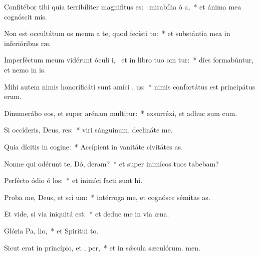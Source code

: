 \item Confitébor tibi quia terribíliter magnifitus es:~\pscross{} mirabília ó a,~* et ánima mea cognóscit mis.
\item Non est occultátum os meum a te, quod fecísti  to:~* et substántia mea in inferióribus ræ.
\item Imperféctum meum vidérunt óculi i,~\pscross{} et in libro tuo om tur:~* dies formabúntur, et nemo in is.
\item Mihi autem nimis honorificáti sunt amíci , us:~* nimis confortátus est principátus erum.
\item Dinumerábo eos, et super arénam multitur:~* exsurréxi, et adhuc sum cum.
\item Si occíderis, Deus, res:~* viri sánguinum, declináte  me.
\item Quia dícitis in cogine:~* Accípient in vanitáte civitátes as.
\item Nonne qui odérunt te, Dó, deram?~* et super inimícos tuos tabebam?
\item Perfécto ódio ó los:~* et inimíci facti sunt hi.
\item Proba me, Deus, et sci  um:~* intérroga me, et cognósce sémitas as.
\item Et vide, si via iniquitá   est:~* et deduc me in via æna.
\item Glória Pa,  lio,~* et Spirítui to.
\item Sicut erat in princípio, et ,  per,~* et in sǽcula sæculórum. men.
